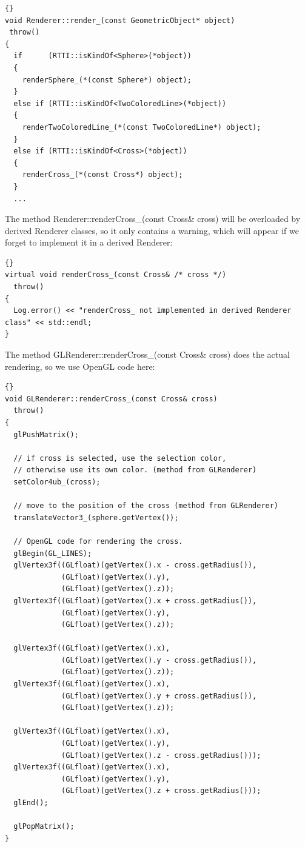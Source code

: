 \begin{lstlisting}{}
void Renderer::render_(const GeometricObject* object)
 throw()
{
  if      (RTTI::isKindOf<Sphere>(*object))         
  { 
    renderSphere_(*(const Sphere*) object);
  }
  else if (RTTI::isKindOf<TwoColoredLine>(*object)) 
  { 
    renderTwoColoredLine_(*(const TwoColoredLine*) object);
  }
  else if (RTTI::isKindOf<Cross>(*object))          
  { 
    renderCross_(*(const Cross*) object);
  }
  ...
\end{lstlisting}

The method Renderer::renderCross\_(const Cross\& cross)
will be overloaded by derived Renderer classes, so it only
contains a warning, which will appear if we forget to 
implement it in a derived Renderer:

\begin{lstlisting}{}
virtual void renderCross_(const Cross& /* cross */)
  throw() 
{
  Log.error() << "renderCross_ not implemented in derived Renderer class" << std::endl;
}
\end{lstlisting}


The method GLRenderer::renderCross\_(const Cross\& cross)
does the actual rendering, so we use OpenGL code here:

\begin{lstlisting}{}
void GLRenderer::renderCross_(const Cross& cross)
  throw() 
{
  glPushMatrix();
	
  // if cross is selected, use the selection color,
  // otherwise use its own color. (method from GLRenderer)
  setColor4ub_(cross);  
	
  // move to the position of the cross (method from GLRenderer)
  translateVector3_(sphere.getVertex());
	
  // OpenGL code for rendering the cross.
  glBegin(GL_LINES);
  glVertex3f((GLfloat)(getVertex().x - cross.getRadius()),
             (GLfloat)(getVertex().y),
             (GLfloat)(getVertex().z));
  glVertex3f((GLfloat)(getVertex().x + cross.getRadius()),
             (GLfloat)(getVertex().y),
             (GLfloat)(getVertex().z));

  glVertex3f((GLfloat)(getVertex().x),
             (GLfloat)(getVertex().y - cross.getRadius()),
             (GLfloat)(getVertex().z));
  glVertex3f((GLfloat)(getVertex().x),
             (GLfloat)(getVertex().y + cross.getRadius()),
             (GLfloat)(getVertex().z));

  glVertex3f((GLfloat)(getVertex().x),
             (GLfloat)(getVertex().y),
             (GLfloat)(getVertex().z - cross.getRadius()));
  glVertex3f((GLfloat)(getVertex().x),
             (GLfloat)(getVertex().y),
             (GLfloat)(getVertex().z + cross.getRadius()));
  glEnd();

  glPopMatrix();
}
\end{lstlisting}

